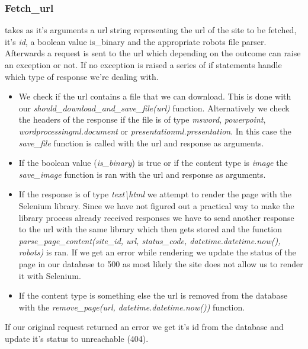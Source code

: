 \documentclass[runningheads]{llncs}
\begin{document}
\subsubsection{Fetch\_url}
takes as it's arguments a url string representing the url of the site to be fetched, it's  \textit{id}, a boolean value is\_binary and the appropriate robots file parser. Afterwards a request is sent to the url which depending on the outcome can raise an exception or not. If no exception is raised a series of if statements handle which type of response we're dealing with. 
\begin{itemize}
  \item We check if the url contains a file that we can download. This is done with our \textit{should\_download\_and\_save\_file(url)} function. Alternatively we check the headers of the response if the file is of type \textit{msword}, \textit{powerpoint}, \textit{wordprocessingml.document} or \textit{presentationml.presentation}. In this case the \textit{save\_file} function is called with the url and response as arguments.
  \item If the boolean value (\textit{is\_binary}) is true or if the content type is \textit{image} the \textit{save\_image} function is ran with the url and response as arguments.
  \item If the response is of type \textit{text\textbackslash html} we attempt to render the page with the Selenium library. Since we have not figured out a practical way to make the library process already received responses we have to send another response to the url with the same library which then gets stored and the function \textit{parse\_page\_content(site\_id, url, status\_code, datetime.datetime.now(), robots)} is ran. If we get an error while rendering we update the status of the page in our database to 500 as most likely the site does not allow us to render it with Selenium.
  \item If the content type is something else the url is removed from the database with the \textit{remove\_page(url, datetime.datetime.now())} function.
\end{itemize}
If our original request returned an error we get it's id from the database and update it's status to unreachable (404).
\begin{lstlisting}

\end{lstlisting}
\end{document}

